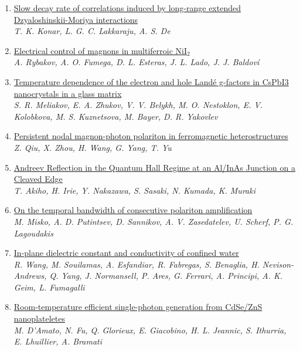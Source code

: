 \documentclass{article}
\begin{document}
\begin{enumerate}
\item\href{http://arxiv.org/abs/2407.21668v1}{\textsf{Slow decay rate of correlations induced by long-range extended
  Dzyaloshinskii-Moriya interactions}}\\
{\small\color{blue}\textsl{T. K. Konar, L. G. C. Lakkaraju, A. S. De}}
\item\href{http://arxiv.org/abs/2407.21645v1}{\textsf{Electrical control of magnons in multiferroic NiI$_2$}}\\
{\small\color{blue}\textsl{A. Rybakov, A. O. Fumega, D. L. Esteras, J. L. Lado, J. J. Baldoví}}
\item\href{http://arxiv.org/abs/2407.21610v1}{\textsf{Temperature dependence of the electron and hole Landé g-factors in
  CsPbI3 nanocrystals in a glass matrix}}\\
{\small\color{blue}\textsl{S. R. Meliakov, E. A. Zhukov, V. V. Belykh, M. O. Nestoklon, E. V. Kolobkova, M. S. Kuznetsova, M. Bayer, D. R. Yakovlev}}
\item\href{http://arxiv.org/abs/2407.21597v1}{\textsf{Persistent nodal magnon-photon polariton in ferromagnetic
  heterostructures}}\\
{\small\color{blue}\textsl{Z. Qiu, X. Zhou, H. Wang, G. Yang, T. Yu}}
\item\href{http://arxiv.org/abs/2407.21557v1}{\textsf{Andreev Reflection in the Quantum Hall Regime at an Al/InAs Junction on
  a Cleaved Edge}}\\
{\small\color{blue}\textsl{T. Akiho, H. Irie, Y. Nakazawa, S. Sasaki, N. Kumada, K. Muraki}}
\item\href{http://arxiv.org/abs/2407.21544v1}{\textsf{On the temporal bandwidth of consecutive polariton amplification}}\\
{\small\color{blue}\textsl{M. Misko, A. D. Putintsev, D. Sannikov, A. V. Zasedatelev, U. Scherf, P. G. Lagoudakis}}
\item\href{http://arxiv.org/abs/2407.21538v1}{\textsf{In-plane dielectric constant and conductivity of confined water}}\\
{\small\color{blue}\textsl{R. Wang, M. Souilamas, A. Esfandiar, R. Fabregas, S. Benaglia, H. Nevison-Andrews, Q. Yang, J. Normansell, P. Ares, G. Ferrari, A. Principi, A. K. Geim, L. Fumagalli}}
\item\href{http://arxiv.org/abs/2407.21504v1}{\textsf{Room-temperature efficient single-photon generation from CdSe/ZnS
  nanoplateletes}}\\
{\small\color{blue}\textsl{M. D'Amato, N. Fu, Q. Glorieux, E. Giacobino, H. L. Jeannic, S. Ithurria, E. Lhuillier, A. Bramati}}

\end{enumerate}
\end{document}
